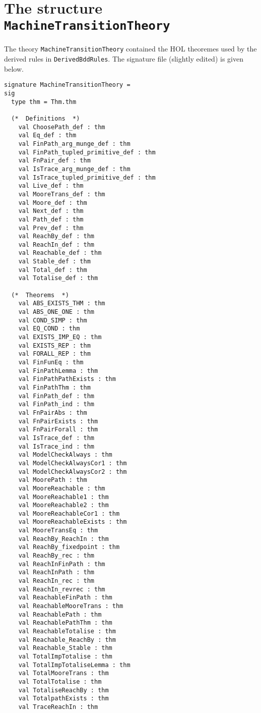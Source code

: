 \documentclass[12pt]{article}
\renewcommand{\t}[1]{\mbox{\tt #1}}
\begin{document}
\section{The structure \t{MachineTransitionTheory}}\label{MachineTransitionTheory}

The theory \t{MachineTransitionTheory} contained the HOL theoremes used
by the derived rules in \t{DerivedBddRules}. The signature file
(slightly edited) is given below.

\begin{footnotesize}
\begin{Verbatim}[commandchars=\$\&\%]
signature MachineTransitionTheory =
sig
  type thm = Thm.thm
  
  (*  Definitions  *)
    val ChoosePath_def : thm
    val Eq_def : thm
    val FinPath_arg_munge_def : thm
    val FinPath_tupled_primitive_def : thm
    val FnPair_def : thm
    val IsTrace_arg_munge_def : thm
    val IsTrace_tupled_primitive_def : thm
    val Live_def : thm
    val MooreTrans_def : thm
    val Moore_def : thm
    val Next_def : thm
    val Path_def : thm
    val Prev_def : thm
    val ReachBy_def : thm
    val ReachIn_def : thm
    val Reachable_def : thm
    val Stable_def : thm
    val Total_def : thm
    val Totalise_def : thm
  
  (*  Theorems  *)
    val ABS_EXISTS_THM : thm
    val ABS_ONE_ONE : thm
    val COND_SIMP : thm
    val EQ_COND : thm
    val EXISTS_IMP_EQ : thm
    val EXISTS_REP : thm
    val FORALL_REP : thm
    val FinFunEq : thm
    val FinPathLemma : thm
    val FinPathPathExists : thm
    val FinPathThm : thm
    val FinPath_def : thm
    val FinPath_ind : thm
    val FnPairAbs : thm
    val FnPairExists : thm
    val FnPairForall : thm
    val IsTrace_def : thm
    val IsTrace_ind : thm
    val ModelCheckAlways : thm
    val ModelCheckAlwaysCor1 : thm
    val ModelCheckAlwaysCor2 : thm
    val MoorePath : thm
    val MooreReachable : thm
    val MooreReachable1 : thm
    val MooreReachable2 : thm
    val MooreReachableCor1 : thm
    val MooreReachableExists : thm
    val MooreTransEq : thm
    val ReachBy_ReachIn : thm
    val ReachBy_fixedpoint : thm
    val ReachBy_rec : thm
    val ReachInFinPath : thm
    val ReachInPath : thm
    val ReachIn_rec : thm
    val ReachIn_revrec : thm
    val ReachableFinPath : thm
    val ReachableMooreTrans : thm
    val ReachablePath : thm
    val ReachablePathThm : thm
    val ReachableTotalise : thm
    val Reachable_ReachBy : thm
    val Reachable_Stable : thm
    val TotalImpTotalise : thm
    val TotalImpTotaliseLemma : thm
    val TotalMooreTrans : thm
    val TotalTotalise : thm
    val TotaliseReachBy : thm
    val TotalpathExists : thm
    val TraceReachIn : thm
  

\end{Verbatim}
\end{footnotesize}
\end{document}
